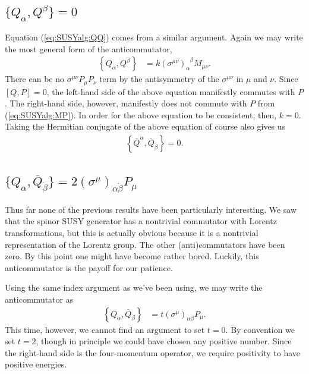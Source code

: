 \documentclass[12pt, oneside]{report}    %
\begin{document}
\subsection{\texorpdfstring{$\{ Q_\alpha,Q^\beta\}=0$}{[Q,Q]}}

Equation (\ref{eq:SUSYalg:QQ}) comes from a similar argument. Again we may write the most general form of the anticommutator,
\begin{align}
    \left\{Q_\alpha,Q^\beta\right\} &= k\left(\sigma^{\mu\nu}\right)_\alpha^{\phantom\alpha\beta}M_{\mu\nu}.
\end{align}
There can be no $\sigma^{\mu\nu}P_\mu P_\nu$ term by the antisymmetry of the $\sigma^{\mu\nu}$ in $\mu$ and $\nu$. Since $[Q,P]=0$, the left-hand side of the above equation manifestly commutes with $P$. The right-hand side, however, manifestly does not commute with $P$ from  (\ref{eq:SUSYalg:MP}). In order for the above equation to be consistent, then, $k=0$. Taking the Hermitian conjugate of the above equation of course also gives us
\begin{align}
    \left\{\overline Q^{\dot\alpha},\overline Q_{\dot\beta}\right\} = 0.
\end{align}

\subsection{\texorpdfstring{$\{Q_\alpha,\overline Q_{\dot{\beta}} \} = 2(\sigma^\mu)_{\alpha\dot{\beta}}P_\mu$}{[Q,Q-bar]}}

Thus far none of the previous results have been particularly interesting. We saw that the spinor SUSY generator has a nontrivial commutator with Lorentz transformations, but this is actually obvious because it is a nontrivial representation of the Lorentz group. The other (anti)commutators have been zero. By this point one might have become rather bored. Luckily, this anticommutator is the payoff for our patience. 

Using the same index argument as we've been using, we may write the anticommutator as
\begin{align}
    \left\{Q_\alpha,\overline Q_{\dot\beta}\right\} &= t(\sigma^\mu)_{\alpha\dot\beta} P_\mu.
\end{align}
This time, however, we cannot find an argument to set $t=0$. By convention we set $t=2$, though in principle we could have chosen any positive number. Since the right-hand side is the four-momentum operator, we require positivity to have positive energies.
\end{document}
